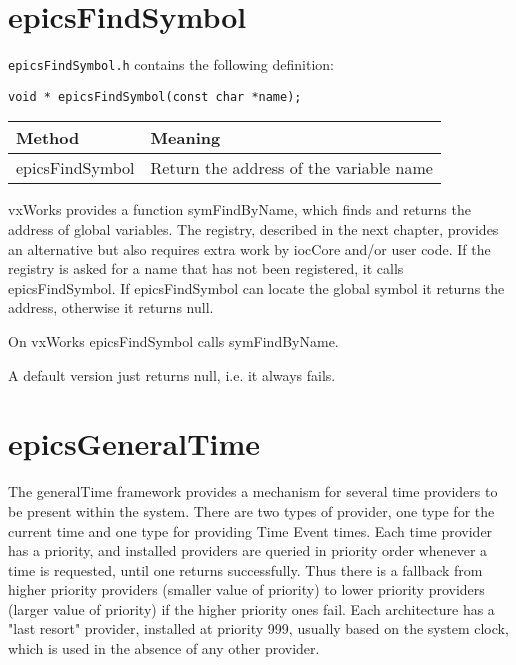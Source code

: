 \section{epicsFindSymbol}

\verb|epicsFindSymbol.h| contains the following definition:

\begin{verbatim}void * epicsFindSymbol(const char *name);\end{verbatim}
\begin{center}\begin{longtable}{p{1.38889in}p{2.5in}}
\textbf{Method} & \textbf{Meaning}\\
\hline
epicsFindSymbol & Return the address of the variable name
\end{longtable}\end{center}


vxWorks provides a function symFindByName, which finds and returns the address of global variables. The registry, 
described in the next chapter, provides an alternative but also requires extra work by iocCore and/or user code. If the 
registry is asked for a name that has not been registered, it calls epicsFindSymbol. If epicsFindSymbol can locate the 
global symbol it returns the address, otherwise it returns null.

On vxWorks epicsFindSymbol calls symFindByName.

A default version just returns null, i.e. it always fails.

\section{epicsGeneralTime}

The generalTime framework provides a mechanism for several time providers to be present within the system.  There are 
two types of provider, one type for the current time and one type for providing Time Event times.  Each time provider has 
a priority, and installed providers are queried in priority order whenever a time is requested, until one returns successfully.  
Thus there is a fallback from higher priority providers (smaller value of priority) to lower priority providers (larger value 
of priority) if the higher priority ones fail.  Each architecture has a "last resort" provider, installed at priority 999, usually 
based on the system clock, which is used in the absence of any other provider.

